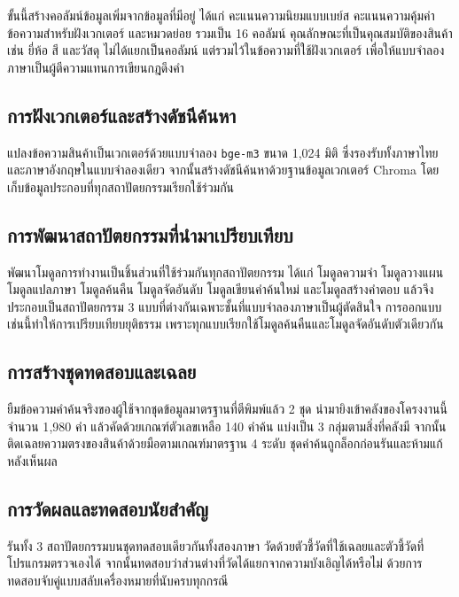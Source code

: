 ขั้นนี้สร้างคอลัมน์ข้อมูลเพิ่มจากข้อมูลที่มีอยู่ ได้แก่ คะแนนความนิยมแบบเบย์ส คะแนนความคุ้มค่า ข้อความสำหรับฝังเวกเตอร์ และหมวดย่อย รวมเป็น 16 คอลัมน์ คุณลักษณะที่เป็นคุณสมบัติของสินค้า เช่น ยี่ห้อ สี และวัสดุ ไม่ได้แยกเป็นคอลัมน์ แต่รวมไว้ในข้อความที่ใช้ฝังเวกเตอร์ เพื่อให้แบบจำลองภาษาเป็นผู้ตีความแทนการเขียนกฎดึงคำ

\subsection{การฝังเวกเตอร์และสร้างดัชนีค้นหา}

แปลงข้อความสินค้าเป็นเวกเตอร์ด้วยแบบจำลอง \texttt{bge-m3} ขนาด 1{,}024 มิติ ซึ่งรองรับทั้งภาษาไทยและภาษาอังกฤษในแบบจำลองเดียว จากนั้นสร้างดัชนีค้นหาด้วยฐานข้อมูลเวกเตอร์ Chroma โดยเก็บข้อมูลประกอบที่ทุกสถาปัตยกรรมเรียกใช้ร่วมกัน

\subsection{การพัฒนาสถาปัตยกรรมที่นำมาเปรียบเทียบ}

พัฒนาโมดูลการทำงานเป็นชิ้นส่วนที่ใช้ร่วมกันทุกสถาปัตยกรรม ได้แก่ โมดูลความจำ โมดูลวางแผน โมดูลแปลภาษา โมดูลค้นคืน โมดูลจัดอันดับ โมดูลเขียนคำค้นใหม่ และโมดูลสร้างคำตอบ แล้วจึงประกอบเป็นสถาปัตยกรรม 3 แบบที่ต่างกันเฉพาะชั้นที่แบบจำลองภาษาเป็นผู้ตัดสินใจ การออกแบบเช่นนี้ทำให้การเปรียบเทียบยุติธรรม เพราะทุกแบบเรียกใช้โมดูลค้นคืนและโมดูลจัดอันดับตัวเดียวกัน

\subsection{การสร้างชุดทดสอบและเฉลย}

ยืมข้อความคำค้นจริงของผู้ใช้จากชุดข้อมูลมาตรฐานที่ตีพิมพ์แล้ว 2 ชุด นำมายิงเข้าคลังของโครงงานนี้จำนวน 1{,}980 คำ แล้วคัดด้วยเกณฑ์ตัวเลขเหลือ 140 คำค้น แบ่งเป็น 3 กลุ่มตามสิ่งที่คลังมี จากนั้นติดเฉลยความตรงของสินค้าด้วยมือตามเกณฑ์มาตรฐาน 4 ระดับ ชุดคำค้นถูกล็อกก่อนรันและห้ามแก้หลังเห็นผล

\subsection{การวัดผลและทดสอบนัยสำคัญ}

รันทั้ง 3 สถาปัตยกรรมบนชุดทดสอบเดียวกันทั้งสองภาษา วัดด้วยตัวชี้วัดที่ใช้เฉลยและตัวชี้วัดที่โปรแกรมตรวจเองได้ จากนั้นทดสอบว่าส่วนต่างที่วัดได้แยกจากความบังเอิญได้หรือไม่ ด้วยการทดสอบจับคู่แบบสลับเครื่องหมายที่นับครบทุกกรณี

